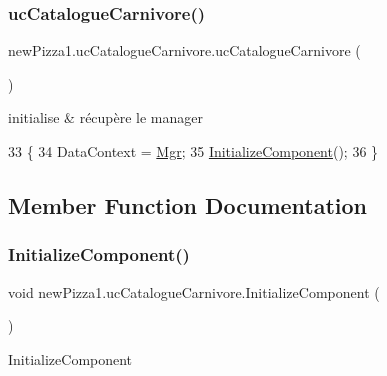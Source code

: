 \subsubsection{\texorpdfstring{uc\+Catalogue\+Carnivore()}{ucCatalogueCarnivore()}}
{\footnotesize\ttfamily new\+Pizza1.\+uc\+Catalogue\+Carnivore.\+uc\+Catalogue\+Carnivore (\begin{DoxyParamCaption}{ }\end{DoxyParamCaption})\hspace{0.3cm}{\ttfamily [inline]}}



initialise \& récupère le manager 


\begin{DoxyCode}
33         \{
34             DataContext = \hyperlink{classnewPizza1_1_1ucCatalogueCarnivore_a8115b482f70d652cf39951cacf7f0385}{Mgr};
35             \hyperlink{classnewPizza1_1_1ucCatalogueCarnivore_ae3fbe460c9b1305f8cd5d685e12746ae}{InitializeComponent}();
36         \}
\end{DoxyCode}


\subsection{Member Function Documentation}
\mbox{\label{classnewPizza1_1_1ucCatalogueCarnivore_ae3fbe460c9b1305f8cd5d685e12746ae}} 
\subsubsection{\texorpdfstring{Initialize\+Component()}{InitializeComponent()}\hspace{0.1cm}{\footnotesize\ttfamily [1/6]}}
{\footnotesize\ttfamily void new\+Pizza1.\+uc\+Catalogue\+Carnivore.\+Initialize\+Component (\begin{DoxyParamCaption}{ }\end{DoxyParamCaption})\hspace{0.3cm}{\ttfamily [inline]}}



Initialize\+Component 


